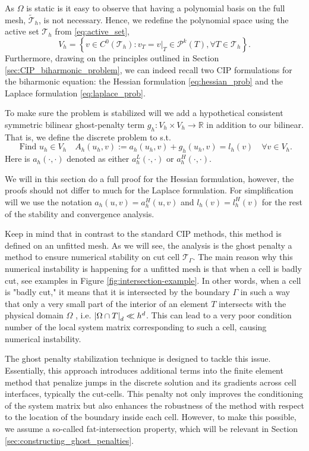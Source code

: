 As $\Omega $ is static is it easy to observe that having a polynomial basis on the full mesh, $\widetilde{\mathcal{T}}_{h}$, is not necessary.
Hence, we redefine the polynomial space using the active set $\mathcal{T}_{h} $ from \eqref{eq:active_set},
\[
V_{h} = \left\{ v \in C^{0}\left( \mathcal{T}_{h}   \right): v_{T} = v | _{T} \in \mathcal{P} ^{k}\left( T \right), \forall T \in
\mathcal{T}_{h}    \right\}.
\]
Furthermore, drawing on the principles outlined in Section \ref{sec:CIP_biharmonic_problem}, we can indeed recall two CIP formulations for the biharmonic equation: the Hessian formulation \eqref{eq:hessian_prob} and the Laplace formulation \eqref{eq:laplace_prob}.

To make sure the problem is stabilized will we add a hypothetical consistent symmetric bilinear ghost-penalty term  $g_{h}: V_{h} \times  V_{h} \to \mathbb{R} $ in addition to our bilinear. That is, we define the discrete problem to  s.t.
\begin{equation}
\label{eq:discrete_CutCIP_prob}
\text{ Find } u_{h} \in V_{h} \quad  A_{h}( u_{h} ,v ) := a_{h}( u_{h}, v)  + g_{h}( u_{h},v) = l_{h} ( v) \quad  \forall v \in  V_{h}.
\end{equation}
Here is $a_{h}( \cdot,\cdot  ) $ denoted as either $a_{h}^{L}( \cdot ,\cdot ) $ or $a_{h}^{H}( \cdot ,\cdot ) $.

We will in this section do a full proof for the Hessian formulation, however, the proofs should not differ to much for the Laplace formulation. For simplification will we use the notation $a_{h}(u,v ) = a_{h}^{H}( u,v)$ and $l_{h}(v) =l_{h}^{H}(v)$ for the rest of the stability and convergence analysis.

Keep in mind that in contrast to the standard CIP methods, this method is defined on an unfitted mesh. As we will see, the analysis is the ghost penalty a method to ensure numerical stability on cut cell $\mathcal{T} _{\Gamma }$. The main reason why
this numerical instability is happening for a unfitted mesh is that when a cell is badly cut, see examples in Figure \ref{fig:intersection-example}.
In other words, when a cell is "badly cut," it means that it is intersected by the boundary $\Gamma$ in such a way that only a very small part of the interior of an element $T$  intersects with the physical domain $\Omega $ , i.e. $\left\lvert  \Omega \cap
T  \right\rvert_{d} \ll h^{d}$. This can lead to a very poor condition number of the local system matrix corresponding to such a cell, causing numerical instability.

The ghost penalty stabilization technique is designed to tackle this issue. Essentially, this approach introduces additional terms into the finite element method that penalize jumps in the discrete solution and its gradients across cell interfaces,
typically the cut-cells. This penalty not only improves the conditioning of the system matrix but also enhances the robustness of the method with respect to the location of the boundary inside each cell. However, to make this possible, we assume a
so-called fat-intersection property, which will be relevant in Section \ref{sec:constructing_ghost_penalties}.

